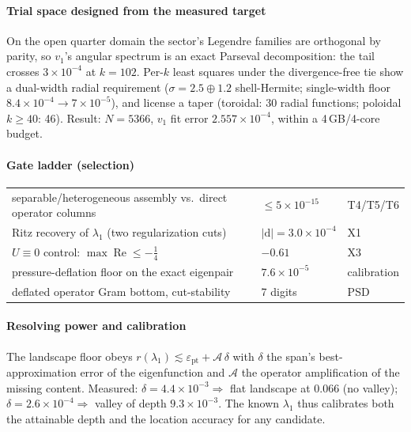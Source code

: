 \documentclass[10pt]{article}
\begin{document}
\paragraph{Trial space designed from the measured target} On the open
quarter domain the sector's Legendre families are orthogonal by
parity, so $v_1$'s angular spectrum is an exact Parseval decomposition:
the tail crosses $3\times 10^{-4}$ at $k = 102$. Per-$k$ least squares
under the divergence-free tie show a dual-width radial requirement
($\sigma = 2.5 \oplus 1.2$ shell-Hermite; single-width floor
$8.4\times 10^{-4} \to 7\times 10^{-5}$), and license a taper
(toroidal: 30 radial functions; poloidal $k \ge 40$: 46). Result:
$N = 5366$, $v_1$ fit error $2.557\times 10^{-4}$, within a
4\,GB/4-core budget.

\paragraph{Gate ladder (selection)}
\begin{center}\small
\begin{tabular}{lll}
\toprule
separable/heterogeneous assembly vs.\ direct operator columns &
$\le 5\times 10^{-15}$ & T4/T5/T6 \\
Ritz recovery of $\lambda_1$ (two regularization cuts) &
$|\mathrm{d}| = 3.0\times 10^{-4}$ & X1 \\
$U \equiv 0$ control: $\max\operatorname{Re} \le -\tfrac14$ &
$-0.61$ & X3 \\
pressure-deflation floor on the exact eigenpair &
$7.6\times 10^{-5}$ & calibration \\
deflated operator Gram bottom, cut-stability & 7 digits & PSD \\
\bottomrule
\end{tabular}
\end{center}

\paragraph{Resolving power and calibration} The landscape floor obeys
$r(\lambda_1) \lesssim \varepsilon_{\mathrm{pt}} + \mathcal{A}\,\delta$
with $\delta$ the span's best-approximation error of the eigenfunction
and $\mathcal{A}$ the operator amplification of the missing content.
Measured: $\delta = 4.4\times 10^{-3} \Rightarrow$ flat landscape at
$0.066$ (no valley); $\delta = 2.6\times 10^{-4} \Rightarrow$ valley of
depth $9.3\times 10^{-3}$. The known $\lambda_1$ thus calibrates both
the attainable depth and the location accuracy for any candidate.
\end{document}
